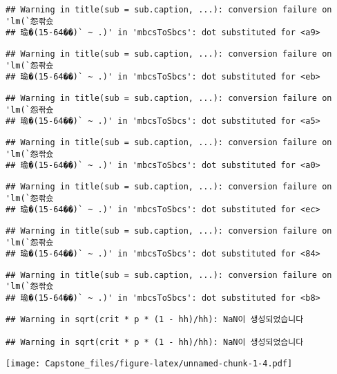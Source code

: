 \documentclass[]{article}
\begin{document}
\begin{verbatim}
## Warning in title(sub = sub.caption, ...): conversion failure on 'lm(`怨좎슜
## 瑜�(15-64��)` ~ .)' in 'mbcsToSbcs': dot substituted for <a9>
\end{verbatim}

\begin{verbatim}
## Warning in title(sub = sub.caption, ...): conversion failure on 'lm(`怨좎슜
## 瑜�(15-64��)` ~ .)' in 'mbcsToSbcs': dot substituted for <eb>
\end{verbatim}

\begin{verbatim}
## Warning in title(sub = sub.caption, ...): conversion failure on 'lm(`怨좎슜
## 瑜�(15-64��)` ~ .)' in 'mbcsToSbcs': dot substituted for <a5>
\end{verbatim}

\begin{verbatim}
## Warning in title(sub = sub.caption, ...): conversion failure on 'lm(`怨좎슜
## 瑜�(15-64��)` ~ .)' in 'mbcsToSbcs': dot substituted for <a0>
\end{verbatim}

\begin{verbatim}
## Warning in title(sub = sub.caption, ...): conversion failure on 'lm(`怨좎슜
## 瑜�(15-64��)` ~ .)' in 'mbcsToSbcs': dot substituted for <ec>
\end{verbatim}

\begin{verbatim}
## Warning in title(sub = sub.caption, ...): conversion failure on 'lm(`怨좎슜
## 瑜�(15-64��)` ~ .)' in 'mbcsToSbcs': dot substituted for <84>
\end{verbatim}

\begin{verbatim}
## Warning in title(sub = sub.caption, ...): conversion failure on 'lm(`怨좎슜
## 瑜�(15-64��)` ~ .)' in 'mbcsToSbcs': dot substituted for <b8>
\end{verbatim}

\begin{verbatim}
## Warning in sqrt(crit * p * (1 - hh)/hh): NaN이 생성되었습니다

## Warning in sqrt(crit * p * (1 - hh)/hh): NaN이 생성되었습니다
\end{verbatim}

\texttt{[image: Capstone\_files/figure-latex/unnamed-chunk-1-4.pdf]}
\end{document}
